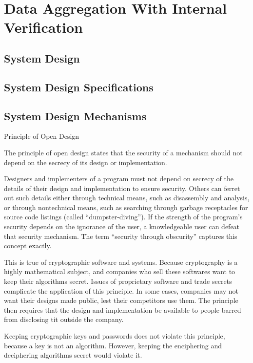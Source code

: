 \chapter{Data Aggregation With Internal Verification} %
\label{cha:Data Aggregation With Internal Verification}
	\section{System Design}
	\section{System Design Specifications}
	\section{System Design Mechanisms}
		Principle of Open Design \cite{bishop2004introduction}
		\begin{definition}
			The principle of open design states that the security of a mechanism should not depend on the secrecy of its design or implementation.
			\label{def:open-design}
		\end{definition}
		Designers and implementers of a program must not depend on secrecy of the details of their design and implementation to ensure security.
		Others can ferret out such details either through technical means, such as disassembly and analysis, or through nontechnical means, such as searching through garbage receptacles for source code listings (called ``dumpster-diving'').
		If the strength of the program's security depends on the ignorance of the user, a knowledgeable user can defeat that security mechanism.
		The term ``security through obscurity'' captures this concept exactly.

		This is true of cryptographic software and systems.
		Because cryptography is a highly mathematical subject, and companies who sell these softwares want to keep their algorithms secret. 
		Issues of proprietary software and trade secrets complicate the application of this principle.
		In some cases, companies may not want their designs made public, lest their competitors use them.
		The principle then requires that the design and implementation be available to people barred from disclosing tit outside the company.

		Keeping cryptographic keys and passwords does not violate this principle, because a key is not an algorithm.
		However, keeping the enciphering and deciphering algorithms secret would violate it.



